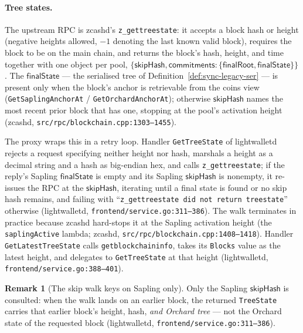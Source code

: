 \documentclass[11pt,a4paper]{article}
\theoremstyle{definition}
\newtheorem{remark}[theorem]{Remark}
\begin{document}
\paragraph{Tree states.} The upstream RPC is \textsf{zcashd}'s
\texttt{z\_gettreestate}: it accepts a block hash or height (negative
heights allowed, $-1$ denoting the last known valid block), requires the
block to be on the main chain, and returns the block's hash, height, and
time together with one object per pool,
$\{\mathsf{skipHash}, \mathsf{commitments} : \{\mathsf{finalRoot},
\mathsf{finalState}\}\}$. The $\mathsf{finalState}$ --- the serialised
tree of Definition~\ref{def:sync-legacy-ser} --- is present only when the
block's anchor is retrievable from the coins view
(\texttt{GetSaplingAnchorAt} / \texttt{GetOrchardAnchorAt}); otherwise
$\mathsf{skipHash}$ names the most recent prior block that has one,
stopping at the pool's activation height
(\textsf{zcashd}, \texttt{src/rpc/blockchain.cpp:1303--1455}).

The proxy wraps this in a retry loop. Handler \texttt{GetTreeState} of
\textsf{lightwalletd} rejects a request specifying neither height nor
hash, marshals a height as a decimal string and a hash as big-endian
hex, and calls \texttt{z\_gettreestate}; if the reply's Sapling
$\mathsf{finalState}$ is empty and its Sapling $\mathsf{skipHash}$ is
nonempty, it re-issues the RPC at the $\mathsf{skipHash}$, iterating
until a final state is found or no skip hash remains, and failing with
``\texttt{z\_gettreestate did not return treestate}'' otherwise
(\textsf{lightwalletd}, \texttt{frontend/service.go:311--386}). The walk
terminates in practice because \textsf{zcashd} hard-stops it at the
Sapling activation height (the \texttt{saplingActive} lambda;
\textsf{zcashd}, \texttt{src/rpc/blockchain.cpp:1408--1418}).
Handler \texttt{GetLatestTreeState} calls \texttt{getblockchaininfo},
takes its
\texttt{Blocks} value as the latest height, and delegates to
\texttt{GetTreeState} at that height
(\textsf{lightwalletd}, \texttt{frontend/service.go:388--401}).

\begin{remark}[The skip walk keys on Sapling only]\label{rem:sync-skiphash}
Only the Sapling $\mathsf{skipHash}$ is consulted: when the walk lands on
an earlier block, the returned \texttt{TreeState} carries that earlier
block's height, hash, \emph{and Orchard tree} --- not the Orchard state
of the requested block
(\textsf{lightwalletd}, \texttt{frontend/service.go:311--386}).
\end{remark}
\end{document}
